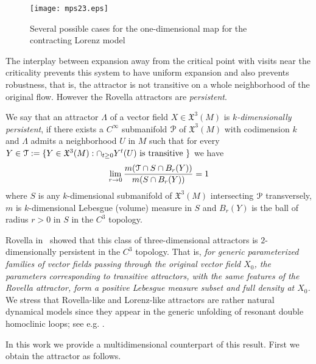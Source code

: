 \documentclass[reqno,12pt,a4paper]{amsart}
\theoremstyle{plain}
\theoremstyle{definition}
\begin{document}
\begin{figure}[htpb]
  \centering
  \texttt{[image: mps23.eps]}
  \caption{Several possible cases for the one-dimensional map for the
    contracting Lorenz model}
  \label{fig:contractingLorenz}
\end{figure}

The interplay between expansion away from the critical point
with visits near the criticality prevents this system to
have uniform expansion and also prevents robustness, that
is, the attractor is not transitive on a whole neighborhood
of the original flow.  However the Rovella attractors are
\emph{persistent}. 

We say that an attractor $\Lambda$ of a vector field
$X\in{{\mathfrak X}}^3(M)$ is \emph{$k$-dimensionally persistent}, if
there exists a $C^\infty$ submanifold ${\EuScript{P}}$ of ${{\mathfrak X}}^3(M)$ with
codimension $k$ and $\Lambda$ admits a neighborhood $U$ in
$M$ such that for every $Y\in{\EuScript{T}}:=\{Y\in{{\mathfrak X}}^3(M):
\cap_{t\ge0}Y^t(U) \text{ is transitive } \}$ we have
\begin{align*}
  \lim_{r\to0} \frac{m({\EuScript{T}}\cap S\cap B_r(Y) )}{m(S\cap B_r(Y))}=1
\end{align*}
where $S$ is any $k$-dimensional submanifold of ${{\mathfrak X}}^3(M)$
intersecting ${\EuScript{P}}$ transversely, $m$ is $k$-dimensional
Lebesgue (volume) measure in $S$ and $B_r(Y)$ is the ball of
radius $r>0$ in $S$ in the $C^3$ topology.

Rovella in~\cite{Ro93} showed that this class of
three-dimensional attractors is $2$-dimensionally persistent
in the $C^3$ topology.  That is, \emph{for generic
  parameterized families of vector fields passing through
  the original vector field $X_0$, the parameters
  corresponding to transitive attractors, with the same
  features of the Rovella attractor, form a positive
  Lebesgue measure subset and full density at $X_0$.} We
stress that Rovella-like and Lorenz-like attractors are
rather natural dynamical models since they appear in the
generic unfolding of resonant double homoclinic loops; see
e.g. \cite{Ro89,Ro92,Ro2000,MPS05,MPsM}.

In this work we provide a multidimensional counterpart of
this result. First we obtain the attractor as follows.
\end{document}
